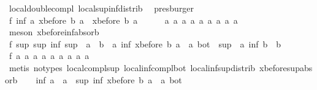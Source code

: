 \begin{isabellebody}
\ local{\isachardot}double{\isacharunderscore}compl\ local{\isachardot}sup{\isacharunderscore}inf{\isacharunderscore}distrib{}\ \isamarkupfalse%
\ presburger\isanewline
\ \ \isamarkupfalse%
\ f{}{}{\isacharcolon}\ {\isachardoublequoteopen}inf\ a\ {\isacharparenleft}xbefore\ b\ a{\isacharparenright}\ {\isacharequal}\ xbefore\ b\ a{\isachardoublequoteclose}\isanewline
\ \ \ \ \isamarkupfalse%
\ a{}\ a{}\ a{}\ a{}\ a{}\ a{}\ a{}\ a{}\ a{}\ \isamarkupfalse%
\ {\isacharparenleft}meson\ xbefore{\isacharunderscore}inf{\isacharunderscore}absorb{\isacharunderscore}{}{\isacharparenright}\isanewline
\ \ \isamarkupfalse%
\ f{}{}{\isacharcolon}\ {\isachardoublequoteopen}sup\ {\isacharparenleft}sup\ {\isacharparenleft}inf\ {\isacharparenleft}sup\ {\isacharparenleft}{\isacharminus}\ a{\isacharparenright}\ {\isacharparenleft}{\isacharminus}\ b{\isacharparenright}{\isacharparenright}\ {\isacharparenleft}{\isacharminus}\ a{\isacharparenright}{\isacharparenright}\ {\isacharparenleft}inf\ {\isacharparenleft}xbefore\ b\ a{\isacharparenright}\ {\isacharparenleft}{\isacharminus}\ a{\isacharparenright}{\isacharparenright}{\isacharparenright}\ bot\ {\isacharequal}\ sup\ {\isacharparenleft}{\isacharminus}\ a{\isacharparenright}\ {\isacharparenleft}inf\ b\ {\isacharparenleft}{\isacharminus}\ b{\isacharparenright}{\isacharparenright}{\isachardoublequoteclose}\isanewline
\ \ \ \ \isamarkupfalse%
\ f{}{}\ a{}\ a{}\ a{}\ a{}\ a{}\ a{}\ a{}\ a{}\ a{}\ \isamarkupfalse%
\ {\isacharparenleft}metis\ {\isacharparenleft}no{\isacharunderscore}types{\isacharparenright}\ local{\isachardot}compl{\isacharunderscore}sup\ local{\isachardot}inf{\isacharunderscore}compl{\isacharunderscore}bot\ local{\isachardot}inf{\isacharunderscore}sup{\isacharunderscore}distrib{}\ xbefore{\isacharunderscore}sup{\isacharunderscore}absorb{\isacharunderscore}{}{\isacharparenright}\isanewline
\ \ \isamarkupfalse%
\ {\isachardoublequoteopen}inf\ a\ {\isacharparenleft}{\isacharminus}\ a{\isacharparenright}\ {\isacharequal}\ sup\ {\isacharparenleft}inf\ {\isacharparenleft}xbefore\ b\ a{\isacharparenright}\ {\isacharparenleft}{\isacharminus}\ a{\isacharparenright}{\isacharparenright}\ bot{\isachardoublequoteclose}\isanewline

\end{isabellebody}
